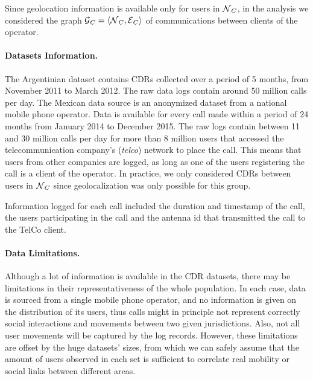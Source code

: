 Since geolocation information is available only for users in $\operatorname{\mathcal{N}}_C$, in the analysis we considered the graph $\operatorname{\mathcal{G}}_C = \left< \operatorname{\mathcal{N}}_C, \operatorname{\mathcal{E}}_C \right> $ of communications between clients of the operator.

\paragraph{Datasets Information.}

The Argentinian dataset contains CDRs collected over a period of 5 months, from November 2011 to March 2012. The raw data logs contain around 50 million calls per day.
The Mexican data source is an anonymized dataset from a national mobile phone operator. Data is available for every call made within a period of 24 months from January 2014 to December 2015. The raw logs contain between 11 and 30 million calls per day for more than 8 million users that accessed the telecommunication company's (\textit{telco}) network to place the call. This means that users from other companies are logged, as long as one of the users registering the call is a client of the operator. In practice, we only considered CDRs between users in $\operatorname{\mathcal{N}}_C$ since geolocalization was only possible for this group.

Information logged for each call included the duration and timestamp of the call, the users participating in the call and the antenna id that transmitted the call to the TelCo client. 


\paragraph{Data Limitations.}
Although a lot of information is available in the CDR datasets, there may be limitations in their representativeness of the whole population. In each case, data is sourced from a single mobile phone operator, and no information is given on the distribution of its users, thus calls might in principle not represent correctly social interactions and movements between two given jurisdictions. Also, not all user movements will be captured by the log records. However, these limitations are offset by the huge datasets' sizes, from which we can safely assume that the amount of users observed in each set is sufficient to correlate real mobility or social links between different areas.


